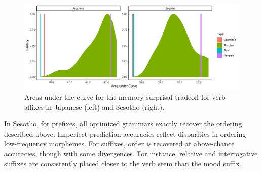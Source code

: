 



\begin{figure}
	\begin{center}
\includegraphics[width=\textwidth]{figures/Both-suffixes-byMorphemes-auc-hist-heldout.pdf}
\end{center}
	\caption{Areas under the curve for the memory-surprisal tradeoff for verb affixes in Japanese (left) and Sesotho (right).}\label{fig:morph-auc}
\end{figure}




In Sesotho, for prefixes, all optimized grammars exactly recover the ordering described above.
Imperfect prediction accuracies reflect disparities in ordering low-frequency morphemes.
For suffixes, order is recovered at above-chance accuracies, though with some divergences.
For instance, relative and interrogative suffixes are consistently placed closer to the verb stem than the mood suffix.

